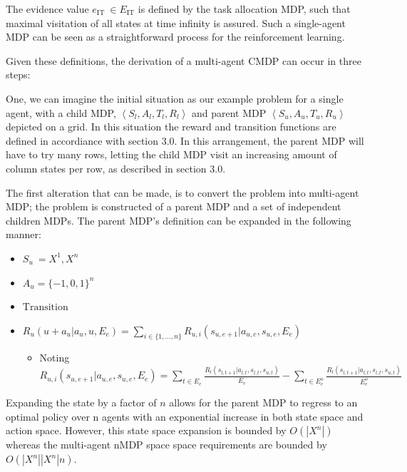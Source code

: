 \documentclass[]{article}
\begin{document}
The evidence value \(e_{\text{IT}}\  \in E_{\text{IT}}\) is defined by
the task allocation MDP, such that maximal visitation of all states at
time infinity is assured. Such a single-agent MDP can be seen as a
straightforward process for the reinforcement learning.

Given these definitions, the derivation of a multi-agent CMDP can occur
in three steps:

One, we can imagine the initial situation as our example problem for a
single agent, with a child MDP,
\(\left\langle S_{l},A_{l},T_{l},R_{l} \right\rangle\) and parent MDP
\(\left\langle S_{u},A_{u},T_{u},R_{u} \right\rangle\) depicted on a
grid. In this situation the reward and transition functions are defined
in accordiance with section 3.0. In this arrangement, the parent MDP
will have to try many rows, letting the child MDP visit an increasing
amount of column states per row, as described in section 3.0.

The first alteration that can be made, is to convert the problem into
multi-agent MDP; the problem is constructed of a parent MDP and a set of
independent children MDPs. The parent MDP's definition can be expanded
in the following manner:

\begin{itemize}
\item
  \(S_{u}\  = X^{1},X^{n}\)
\item
  \(A_{u} = {\{ - 1,0,1\}}^{n}\)
\item
  \(\text{Transition}\)
\item
  \(R_{u}\left( u + a_{u}|a_{u},u,E_{e} \right) = \sum_{i \in \{ 1,\ldots,n\}}^{\ }{R_{u,i}\left( s_{u,e + 1}|a_{u,e},s_{u,e},E_{e} \right)}\)

  \begin{itemize}
  \item
    Noting
    \(R_{u,i}\left( s_{u,e + 1}|a_{u,e},s_{u,e},E_{e} \right) = \sum_{t \in E_{e}}^{\ }\frac{R_{l}\left( s_{l,t + 1}|a_{l,t},s_{l,t},s_{u,t} \right)}{\overset{}{E_{e}}} - \sum_{t \in E_{e}^{o}}^{\ }\frac{R_{l}\left( s_{l,t + 1}|a_{l,t},s_{l,t},s_{u,t} \right)}{\overset{}{E_{e}^{o}}}\)
  \end{itemize}
\end{itemize}

Expanding the state by a factor of \(n\) allows for the parent MDP to
regress to an optimal policy over \(\text{n\ }\)agents with an
exponential increase in both state space and action space. However, this
state space expansion is bounded by \(O(\left| X^{n} \right|)\) whereas
the multi-agent nMDP space space requirements are bounded by
\(O(\left| X^{n} \right|\left| X^{n} \right|n)\).
\end{document}
